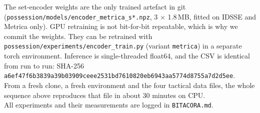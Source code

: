 \documentclass[10pt,a4paper]{article}
\newcommand{\code}[1]{\texttt{#1}}
\begin{document}
The set-encoder weights are the only trained artefact in git
(\code{possession/models/encoder\_metrica\_s*.npz}, 3 $\times$ 1.8\,MB, fitted on IDSSE and Metrica
only). GPU retraining is not bit-for-bit repeatable, which is why we commit the weights. They can
be retrained with \code{possession/experiments/encoder\_train.py} (variant \code{metrica}) in a
separate torch environment. Inference is single-threaded float64, and the CSV is identical from run
to run: SHA-256\\
\code{a6ef47f6b3839a39b03909ceee2531bd7610820eb6943aa5774d8755a7d2d5ee}.\\
From a fresh clone, a fresh environment and the four tactical data files, the whole sequence above
reproduces that file in about 30 minutes on CPU.\\
All experiments and their measurements are logged in \code{BITACORA.md}.
\end{document}
